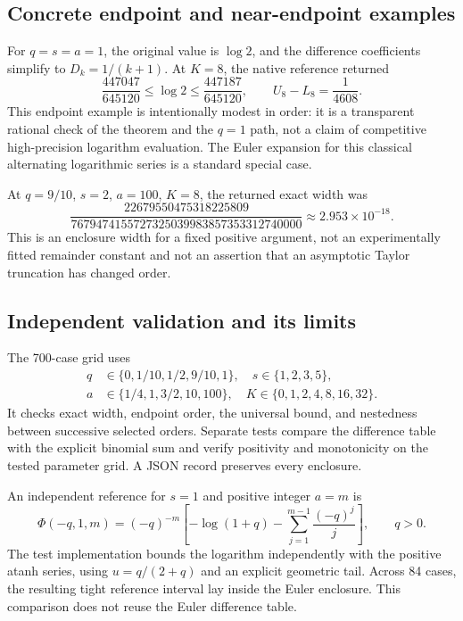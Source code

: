 \documentclass[11pt,a4paper]{article}
\begin{document}
\subsection{Concrete endpoint and near-endpoint examples}
For $q=s=a=1$, the original value is $\log2$, and the difference coefficients simplify to $D_k=1/(k+1)$. At $K=8$, the native reference returned
\[
 \frac{447047}{645120}\le\log2\le\frac{447187}{645120},
 \qquad U_8-L_8=\frac1{4608}.
\]
This endpoint example is intentionally modest in order: it is a transparent rational check of the theorem and the $q=1$ path, not a claim of competitive high-precision logarithm evaluation. The Euler expansion for this classical alternating logarithmic series is a standard special case.\cite{euler}

At $q=9/10$, $s=2$, $a=100$, $K=8$, the returned exact width was
\begin{equation}
 \frac{22679550475318225809}
 {7679474155727325039983857353312740000}
 \approx 2.953\times10^{-18}.
\end{equation}
This is an enclosure width for a fixed positive argument, not an experimentally fitted remainder constant and not an assertion that an asymptotic Taylor truncation has changed order.

\subsection{Independent validation and its limits}
The 700-case grid uses
\[
\begin{split}
 q&\in\{0,1/10,1/2,9/10,1\},\quad s\in\{1,2,3,5\},\\
 a&\in\{1/4,1,3/2,10,100\},\quad K\in\{0,1,2,4,8,16,32\}.
\end{split}
\]
It checks exact width, endpoint order, the universal bound, and nestedness between successive selected orders. Separate tests compare the difference table with the explicit binomial sum and verify positivity and monotonicity on the tested parameter grid. A JSON record preserves every enclosure.

An independent reference for $s=1$ and positive integer $a=m$ is
\begin{equation}
 \Phi(-q,1,m)=(-q)^{-m}
 \left[-\log(1+q)-\sum_{j=1}^{m-1}\frac{(-q)^j}{j}\right],
 \qquad q>0.
\label{eq:logreference}
\end{equation}
The test implementation bounds the logarithm independently with the positive atanh series, using $u=q/(2+q)$ and an explicit geometric tail. Across 84 cases, the resulting tight reference interval lay inside the Euler enclosure. This comparison does not reuse the Euler difference table.
\end{document}

